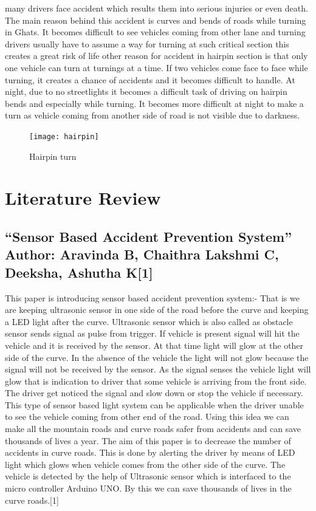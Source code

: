 \documentclass[conference]{IEEEtran}
\begin{document}
    many drivers face accident which results them into serious injuries or even death. The main reason behind
    this accident is curves and bends of roads while turning in Ghats. It becomes difficult to see vehicles coming
    from other lane and turning drivers usually have to assume a way for turning at such critical section this
    creates a great risk of life other reason for accident in hairpin section is that only one vehicle can turn at
    turnings at a time. If two vehicles come face to face while turning, it creates a chance of accidents and it
    becomes difficult to handle. At night, due to no streetlights it becomes a difficult task of driving on hairpin
    bends and especially while turning. It becomes more difficult at night to make a turn as vehicle coming from
    another side of road is not visible due to darkness.
    \begin{figure}[htbp]
        \centerline{\texttt{[image: hairpin]}}
        \caption{Hairpin turn}
        \label{fig}
    \end{figure}

    \section{Literature Review}

    \subsection{“Sensor Based Accident Prevention System” Author: Aravinda B, Chaithra Lakshmi C, Deeksha, Ashutha K[1]}

    This paper is introducing sensor based accident prevention system:- That is we are keeping ultrasonic sensor in one side of the road
    before the curve and keeping a LED light after the curve. Ultrasonic sensor which is also called as obstacle sensor sends signal as
    pulse from trigger. If vehicle is present signal will hit the vehicle and it is received by the sensor. At that time light will glow at the
    other side of the curve. In the absence of the vehicle the light will not glow because the signal will not be received by the sensor. As
    the signal senses the vehicle light will glow that is indication to driver that some vehicle is arriving from the front side. The driver
    get noticed the signal and slow down or stop the vehicle if necessary. This type of sensor based light system can be applicable when
    the driver unable to see the vehicle coming from other end of the road. Using this idea we can make all the mountain roads and
    curve roads safer from accidents and can save thousands of lives a year. The aim of this paper is to decrease the number of accidents
    in curve roads. This is done by alerting the driver by means of LED light which glows when vehicle comes from the other side of
    the curve. The vehicle is detected by the help of Ultrasonic sensor which is interfaced to the micro controller Arduino UNO. By this
    we can save thousands of lives in the curve roads.[1]
    
\end{document}

